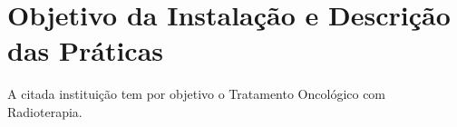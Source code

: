 \chapter{Objetivo da Instalação e Descrição das Práticas}
A citada instituição tem por objetivo o Tratamento Oncológico com Radioterapia.
